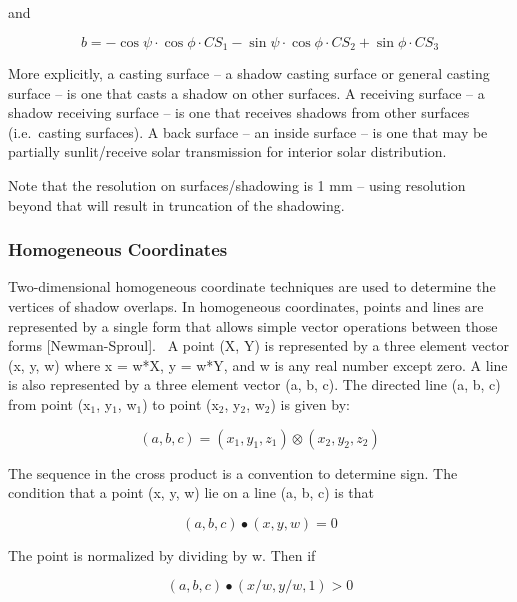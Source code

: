 and

\begin{equation}
b =  - \cos \psi \cdot \cos \phi \cdot C{S_1} - \sin \psi \cdot \cos \phi \cdot C{S_2} + \sin \phi \cdot C{S_3}
\end{equation}

More explicitly, a casting surface -- a shadow casting surface or general casting surface -- is one that casts a shadow on other surfaces. A receiving surface -- a shadow receiving surface -- is one that receives shadows from other surfaces (i.e.~casting surfaces). A back surface -- an inside surface -- is one that may be partially sunlit/receive solar transmission for interior solar distribution.

Note that the resolution on surfaces/shadowing is 1 mm -- using resolution beyond that will result in truncation of the shadowing.

\subsubsection{Homogeneous Coordinates}\label{homogeneous-coordinates}

Two-dimensional homogeneous coordinate techniques are used to determine the vertices of shadow overlaps. In homogeneous coordinates, points and lines are represented by a single form that allows simple vector operations between those forms {[}Newman-Sproul{]}.~ A point (X, Y) is represented by a three element vector (x, y, w) where x = w*X, y = w*Y, and w is any real number except zero. A line is also represented by a three element vector (a, b, c). The directed line (a, b, c) from point (x\(_{1}\), y\(_{1}\), w\(_{1}\)) to point (x\(_{2}\), y\(_{2}\), w\(_{2}\)) is given by:

\begin{equation}
(a,b,c) = ({x_1},{y_1},{z_1}) \otimes ({x_2},{y_2},{z_2})
\end{equation}

The sequence in the cross product is a convention to determine sign. The condition that a point (x, y, w) lie on a line (a, b, c) is that

\begin{equation}
(a,b,c) \bullet (x,y,w) = 0
\end{equation}

The point is normalized by dividing by w. Then if

\begin{equation}
(a,b,c) \bullet (x/w,y/w,1) > 0
\end{equation}

